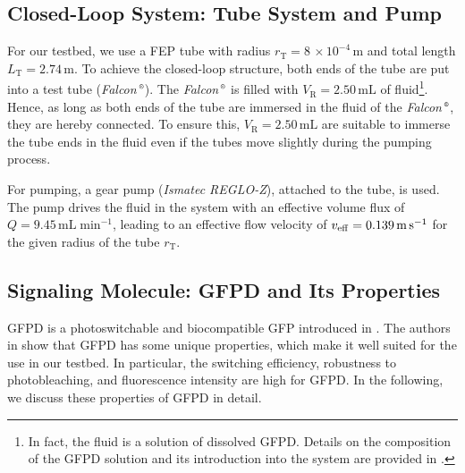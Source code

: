 \subsection{Closed-Loop System: Tube System and Pump}\label{subsec:structure}
\scaleSubsectionBelow
For our testbed, we use a \ac{FEP} tube with radius $r_\mathrm{T} = 8 \, \times 10^{-4} \, \si{\meter}$ and total length $L_\mathrm{T} = 2.74 \,\si{\meter}$. To achieve the closed-loop structure, both ends of the tube are put into a test tube (\textit{Falcon}$\,\textsuperscript{\tiny\textregistered}$). The \textit{Falcon}$\,\textsuperscript{\tiny\textregistered}$ is filled with $V_\mathrm{R} = 2.50 \,\si{\milli\liter}$ of fluid\footnote{In fact, the fluid is a solution of dissolved \ac{GFPD}. Details on the composition of the \ac{GFPD} solution and its introduction into the system are provided in .}. Hence, as long as both ends of the tube are immersed in the fluid of the \textit{Falcon}$\,\textsuperscript{\tiny\textregistered}$, they are hereby connected. To ensure this, $V_\mathrm{R} = 2.50 \,\si{\milli\liter}$ are suitable to immerse the tube ends in the fluid even if the tubes move slightly during the pumping process.

For pumping, a gear pump (\textit{Ismatec REGLO-Z}), attached to the tube, is used. The pump drives the fluid in the system with an effective volume flux of $Q = 9.45 \, \mathrm{mL}\;\mathrm{min}^{-1}$, leading to an effective flow velocity of $v_{\mathrm{eff}} = 0.139 \,\si{\meter \per\second}$ for the given radius of the tube $r_\mathrm{T}$. 
%
\scaleSubsection
\subsection{Signaling Molecule: GFPD and Its Properties}\label{subsec:GFPD}
\scaleSubsectionBelow
\ac{GFPD} is a photoswitchable and biocompatible \ac{GFP} introduced in \cite{brakemann2011reversibly}. The authors in \cite{brakemann2011reversibly} show that \ac{GFPD} has some unique properties, which make it well suited for the use in our testbed. In particular, the switching efficiency, robustness to photobleaching, and fluorescence intensity are high for \ac{GFPD}. In the following, we discuss these properties of \ac{GFPD} in detail. 
%
\scaleSubsubsection
